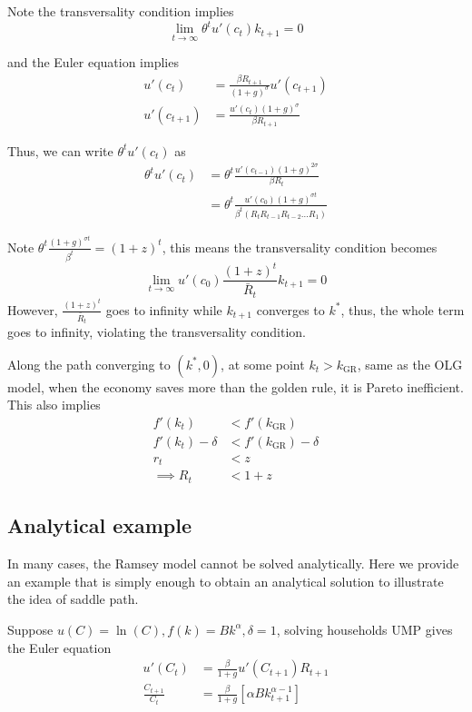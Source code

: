 \documentclass[twocolumn, fleqn]{article}
\begin{document}
			Note the transversality condition implies
			\[\lim_{t \rightarrow \infty} \theta^t u'(c_t)k_{t+1} =0 \tag{9}\]

			and the Euler equation implies
			\begin{align*}
				u'(c_t) &= \frac{\beta R_{t+1}}{(1+g)^\sigma} u'(c_{t+1})\\
				u'(c_{t+1}) &= \frac{u'(c_t)(1+g)^\sigma}{\beta R_{t+1}}
			\end{align*}

			Thus, we can write $\theta^t u'(c_t)$ as
			\begin{align*}
				\theta^t u'(c_t) &= \theta^t \frac{u'(c_{t-1})(1+g)^{2\sigma}}{\beta R_{t}}\\
				&= \theta^t \frac{u'(c_0)(1+g)^{\sigma t}}{\beta^t(R_t R_{t-1} R_{t-2}\ldots R_1)}
			\end{align*}

			Note $\theta^t \frac{(1+g)^{\sigma t}}{\beta^t}= (1+z)^t$, this means the transversality condition becomes
			\[\lim_{t \rightarrow \infty} u'(c_0) \frac{(1+z)^t}{\bar{R}_t}k_{t+1}=0\]
			However, $\frac{(1+z)^t}{\bar{R}_t}$ goes to infinity while $k_{t+1}$ converges to $k^\ast$, thus, the
			whole term goes to infinity, violating the transversality condition.

			Along the path converging to $(k^\ast, 0)$, at some point $k_t > k_{\text{GR}}$, same as the OLG model,
			when the economy saves more than the golden rule, it is Pareto inefficient.
			This also implies
			\begin{align*}
				f'(k_t)&<f'(k_{\text{GR}})\\
				f'(k_t)-\delta &<f'(k_{\text{GR}}) -\delta\\
				r_t &< z\\
				\implies R_t &< 1+z
			\end{align*}

			\subsection{Analytical example}\label{subsec:analytical-example}
			In many cases, the Ramsey model cannot be solved analytically.
			Here we provide an example that is simply
			enough to obtain an analytical solution to illustrate the idea of saddle path.

			Suppose $u(C)= \ln(C), f(k)=Bk^\alpha, \delta = 1$, solving households UMP gives the Euler equation
			\begin{align*}
				u'(C_t ) &= \frac{\beta}{1+g}u'(C_{t+1})R_{t+1}\\
				\frac{C_{t+1}}{C_t} &= \frac{\beta}{1+g}[\alpha B k_{t+1}^{\alpha-1}]
			\end{align*}
\end{document}
